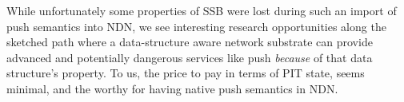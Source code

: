 \documentclass[9pt,sigconf]{acmart}
\begin{document}
While unfortunately some properties of SSB were lost during such an
import of push semantics into NDN, we see interesting research
opportunities along the sketched path where a data-structure aware
network substrate can provide advanced and potentially dangerous
services like push {\em because} of that data structure’s property. To
us, the price to pay in terms of PIT state, seems minimal, and the
worthy for having native push semantics in NDN.





\end{document}
